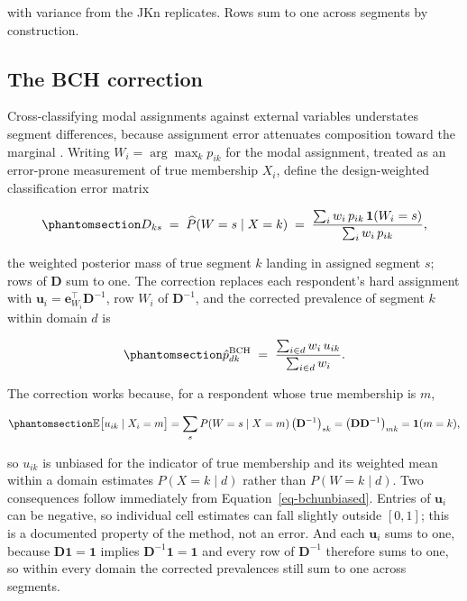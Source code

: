 \documentclass[
  12pt]{article}
\begin{document}
with variance from the JKn replicates. Rows sum to one across segments
by construction.

\subsection{The BCH correction}\label{sec-bch}

Cross-classifying modal assignments against external variables
understates segment differences, because assignment error attenuates
composition toward the marginal \citep{bolck2004}. Writing
\(W_i = \arg\max_k p_{ik}\) for the modal assignment, treated as an
error-prone measurement of true membership \(X_i\), define the
design-weighted classification error matrix

\begin{equation}\phantomsection\label{eq-bchD}{
D_{ks} \;=\; \widehat{P}(W = s \mid X = k) \;=\;
\frac{\sum_i w_i\, p_{ik}\, \mathbf{1}(W_i = s)}{\sum_i w_i\, p_{ik}},
}\end{equation}

the weighted posterior mass of true segment \(k\) landing in assigned
segment \(s\); rows of \(\mathbf{D}\) sum to one. The correction
replaces each respondent's hard assignment with
\(\mathbf{u}_i = \mathbf{e}_{W_i}^{\top} \mathbf{D}^{-1}\), row \(W_i\)
of \(\mathbf{D}^{-1}\), and the corrected prevalence of segment \(k\)
within domain \(d\) is

\begin{equation}\phantomsection\label{eq-bchdom}{
\hat p^{\mathrm{BCH}}_{dk} \;=\; \frac{\sum_{i \in d} w_i\, u_{ik}}{\sum_{i \in d} w_i}.
}\end{equation}

The correction works because, for a respondent whose true membership is
\(m\),

\begin{equation}\phantomsection\label{eq-bchunbiased}{
\mathbb{E}\big[u_{ik} \mid X_i = m\big]
= \sum_{s} P(W = s \mid X = m)\,\big(\mathbf{D}^{-1}\big)_{sk}
= \big(\mathbf{D}\mathbf{D}^{-1}\big)_{mk} = \mathbf{1}(m = k),
}\end{equation}

so \(u_{ik}\) is unbiased for the indicator of true membership and its
weighted mean within a domain estimates \(P(X = k \mid d)\) rather than
\(P(W = k \mid d)\). Two consequences follow immediately from
Equation~\ref{eq-bchunbiased}. Entries of \(\mathbf{u}_i\) can be
negative, so individual cell estimates can fall slightly outside
\([0,1]\); this is a documented property of the method, not an error.
And each \(\mathbf{u}_i\) sums to one, because
\(\mathbf{D}\mathbf{1} = \mathbf{1}\) implies
\(\mathbf{D}^{-1}\mathbf{1} = \mathbf{1}\) and every row of
\(\mathbf{D}^{-1}\) therefore sums to one, so within every domain the
corrected prevalences still sum to one across segments.
\end{document}
